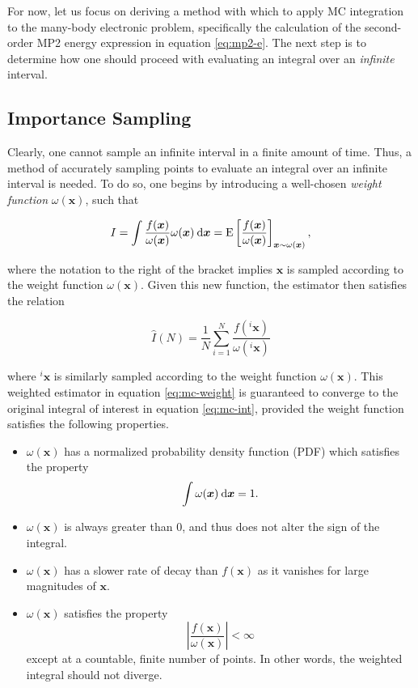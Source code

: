 For now, let us focus on deriving a method with which to apply MC integration to
the many-body electronic problem, specifically the calculation of the
second-order MP2 energy expression in equation \ref{eq:mp2-e}. The next step is
to determine how one should proceed with evaluating an integral over an
\emph{infinite} interval.

\subsection{Importance Sampling}

Clearly, one cannot sample an infinite interval in a finite amount of time.
Thus, a method of accurately sampling points to evaluate an integral over an
infinite interval is needed. To do so, one begins by introducing a well-chosen
\emph{weight function} $\omega(\bm x)$, such that

\begin{equation}
	I = \int \frac{f(\bm x)}{\omega(\bm x)} \omega(\bm x) \:\mathrm{d} \bm x
	= \text E\left[\frac{f(\bm x)}{\omega(\bm x)} \right]_{\bm x \sim \omega(\bm x)},
\end{equation}

\noindent where the notation to the right of the bracket implies $\bm x$ is
sampled according to the weight function $\omega(\bm x)$. Given this new
function, the estimator then satisfies the relation

\begin{equation}
	\hat I(N) = \frac{1}{N} \sum_{i = 1}^N \frac{f(^i \bm x)}{\omega(^i \bm x)}
	\label{eq:mc-weight}
\end{equation}

\noindent where $^i\bm x$ is similarly sampled according to the weight function
$\omega(\bm x)$. This weighted estimator in equation \ref{eq:mc-weight} is
guaranteed to converge to the original integral of interest in equation
\ref{eq:mc-int}, provided the weight function satisfies the following properties.
\cite{mc-book}

\begin{itemize}
	\item $\omega(\bm x)$ has a normalized probability density function (PDF)
		which satisfies the property
		\begin{equation} \int \omega(\bm x) \:\mathrm{d} \bm x = 1. \end{equation}

	\item  $\omega(\bm x)$ is always greater than 0, and thus does not alter
		the sign of the integral.

	\item $\omega(\bm x)$ has a slower rate of decay than $f(\bm x)$
		as it vanishes for large magnitudes of $\bm x$.

	\item $\omega(\bm x)$ satisfies the property
		\begin{equation} \left|\frac{f(\bm x)}{\omega(\bm x)}\right| < \infty \end{equation}
		except at a countable, finite number of points. In other words,
		the weighted integral should not diverge.
\end{itemize}

